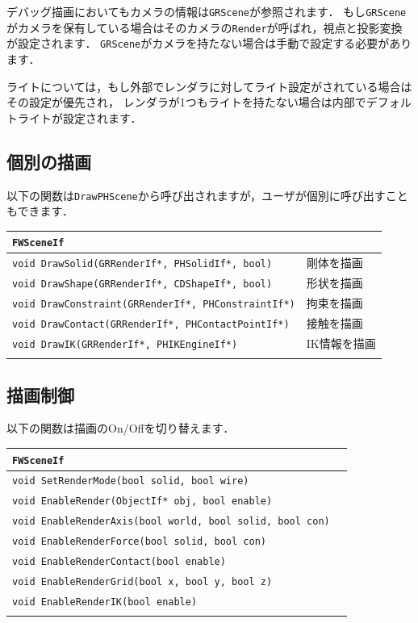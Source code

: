 \KLUDGE デバッグ描画においてもカメラの情報は\texttt{GRScene}\KLUDGE が参照されます．
\KLUDGE もし\texttt{GRScene}\KLUDGE がカメラを保有している場合はそのカメラの\texttt{Render}\KLUDGE が呼ばれ，視点と投影変換が設定されます．
\texttt{GRScene}\KLUDGE がカメラを持たない場合は手動で設定する必要があります．

\KLUDGE ライトについては，もし外部でレンダラに対してライト設定がされている場合はその設定が優先され，
\KLUDGE レンダラが1\KLUDGE つもライトを持たない場合は内部でデフォルトライトが設定されます．

\subsection*{\KLUDGE 個別の描画}

\KLUDGE 以下の関数は\texttt{DrawPHScene}\KLUDGE から呼び出されますが，ユーザが個別に呼び出すこともできます．

\noindent
\begin{tabular}{p{.7\hsize}p{.2\hsize}}
\\
\texttt{FWSceneIf}												\\ \midrule
\texttt{void DrawSolid(GRRenderIf*, PHSolidIf*, bool)}		&	\KLUDGE 剛体を描画\\
\texttt{void DrawShape(GRRenderIf*, CDShapeIf*, bool)}		&	\KLUDGE 形状を描画\\
\texttt{void DrawConstraint(GRRenderIf*, PHConstraintIf*)}	&	\KLUDGE 拘束を描画\\
\texttt{void DrawContact(GRRenderIf*, PHContactPointIf*)}	&	\KLUDGE 接触を描画\\
\texttt{void DrawIK(GRRenderIf*, PHIKEngineIf*)}			&	IK\KLUDGE 情報を描画\\
\\
\end{tabular}

\subsection*{\KLUDGE 描画制御}

\KLUDGE 以下の関数は描画のOn/Off\KLUDGE を切り替えます．

\noindent
\begin{tabular}{p{.8\hsize}p{.1\hsize}}
\\
\texttt{FWSceneIf}													\\ \midrule
\texttt{void SetRenderMode(bool solid, bool wire)}					&	\\
\texttt{void EnableRender(ObjectIf* obj, bool enable)}				&	\\
\texttt{void EnableRenderAxis(bool world, bool solid, bool con)}	&	\\
\texttt{void EnableRenderForce(bool solid, bool con)}				&	\\
\texttt{void EnableRenderContact(bool enable)}						&	\\
\texttt{void EnableRenderGrid(bool x, bool y, bool z)}				&	\\
\texttt{void EnableRenderIK(bool enable)}							&	\\
\\
\end{tabular}


